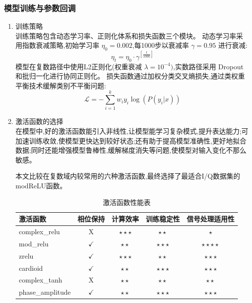 \documentclass{article}
\begin{document}
\begin{CJK}{UTF8}{gbsn}
\subsubsection{模型训练与参数回调}
\begin{enumerate}
    \item 训练策略 \\
    训练策略包含动态学习率、正则化体系和损失函数三个模块。
    动态学习率采用指数衰减策略,初始学习率 $\eta_{0}=0.002$,每1000步以衰减率 $\gamma=0.95$ 进行衰减:
    \begin{equation}
        \eta_{t}=\eta_{0}\cdot\gamma^{[\frac{t}{1000}]}
        \label{eq:learning_rate_decay}
    \end{equation}
    模型在复数路径中使用L2正则化(权重衰减 $\lambda=10^{-4})$,实数路径采用 Dropout 和批归一化进行协同正则化。
    损失函数通过加权分类交叉熵损失,通过类权重平衡技术缓解类别不平衡问题:
    \begin{equation}
        \mathcal{L}=-\sum_{i=1}^{k}w_{i}y_{i}\log(P(y_{i}|x))
        \label{eq:weighted_cross_entropy}
    \end{equation}
    \item 激活函数的选择 \\
    在模型中,好的激活函数能引入非线性,让模型能学习复杂模式,提升表达能力;可加速训练收敛,使模型更快达到较好状态;还有助于提高模型准确性,更好地拟合数据;同时还能增强模型鲁棒性,缓解梯度消失等问题,使模型对输入变化不那么敏感。

    本文比较在复数域内较常用的六种激活函数,最终选择了最适合I/Q数据集的modReLU函数。

    \begin{table}[H]
        \centering
        \caption{激活函数性能表}
        \begin{tabular}{|l|c|c|c|c|}
            \hline
            \textbf{激活函数} & \textbf{相位保持} & \textbf{计算效率} & \textbf{训练稳定性} & \textbf{信号处理适用性} \\
            \hline
            complex\_relu & X & $\star\star\star$ & $\star\star$ & $\star$ \\
            \hline
            mod\_relu & $\checkmark$ & $\star\star$ & $\star\star\star$ & $\star\star\star\star$ \\
            \hline
            zrelu & $\checkmark$ & $\star\star\star$ & $\star\star$ & $\star\star\star$ \\
            \hline
            cardioid & $\checkmark$ & $\star\star$ & $\star\star\star$ & $\star\star\star$ \\
            \hline
            complex\_tanh & X & $\star\star$ & $\star\star$ & $\star\star$ \\
            \hline
            phase\_amplitude & $\checkmark$ & $\star\star$ & $\star\star\star$ & $\star\star\star$ \\
            \hline
        \end{tabular}
        \label{tab:activation_functions}
    \end{table}


\end{enumerate}
\end{CJK}
\end{document}
